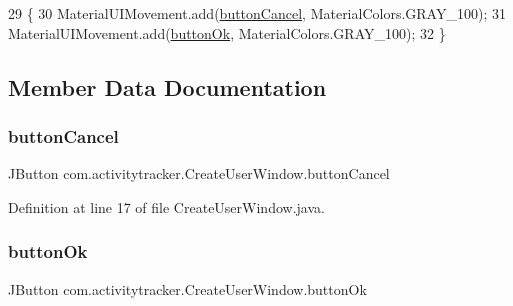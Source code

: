 \begin{DoxyCode}
29                            \{
30         MaterialUIMovement.add(\mbox{\hyperlink{classcom_1_1activitytracker_1_1_create_user_window_a975a5cc35d145a3efa4d9e340776ca63}{buttonCancel}}, MaterialColors.GRAY\_100);
31         MaterialUIMovement.add(\mbox{\hyperlink{classcom_1_1activitytracker_1_1_create_user_window_aa22864c8baa65b46fe9a7621748d7841}{buttonOk}}, MaterialColors.GRAY\_100);
32     \}
\end{DoxyCode}


\subsection{Member Data Documentation}
\mbox{\label{classcom_1_1activitytracker_1_1_create_user_window_a975a5cc35d145a3efa4d9e340776ca63}} 
\subsubsection{\texorpdfstring{button\+Cancel}{buttonCancel}}
{\footnotesize\ttfamily J\+Button com.\+activitytracker.\+Create\+User\+Window.\+button\+Cancel\hspace{0.3cm}{\ttfamily [private]}}



Definition at line 17 of file Create\+User\+Window.\+java.

\mbox{\label{classcom_1_1activitytracker_1_1_create_user_window_aa22864c8baa65b46fe9a7621748d7841}} 
\subsubsection{\texorpdfstring{button\+Ok}{buttonOk}}
{\footnotesize\ttfamily J\+Button com.\+activitytracker.\+Create\+User\+Window.\+button\+Ok\hspace{0.3cm}{\ttfamily [private]}}



